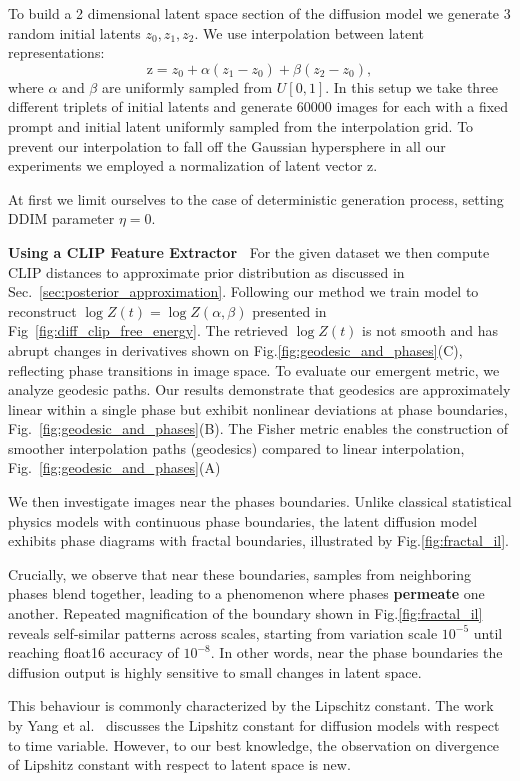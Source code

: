 \documentclass{article}
\theoremstyle{plain}
\theoremstyle{definition}
\theoremstyle{remark}
\begin{document}
To build a 2 dimensional latent space section of the diffusion model we generate 3 random initial latents $z_0, z_1, z_2$. We use interpolation between latent representations:
\[
\text{z} = z_0 + \alpha (z_1 - z_0) + \beta (z_2 - z_0),
\]
where $\alpha$ and $\beta$ are uniformly sampled from $U[0,1]$. 
In this setup we take three different triplets of initial latents and generate 60000 images for each with a fixed prompt and initial latent uniformly sampled from the interpolation grid. To prevent our interpolation to fall off the Gaussian hypersphere in all our experiments we employed a normalization of latent vector z.

At first we limit ourselves to the case of deterministic generation process, setting DDIM parameter $\eta=0$. 

\textbf{Using a CLIP Feature Extractor~} For the given dataset we then compute CLIP distances to approximate prior distribution as discussed in Sec.~\ref{sec:posterior_approximation}. Following our method we train model to reconstruct $\log Z(t) = \log Z(\alpha,\beta)$ presented in Fig~\ref{fig:diff_clip_free_energy}.
The retrieved $\log Z(t)$ is not smooth and has abrupt changes in derivatives shown on Fig.\ref{fig:geodesic_and_phases}(C), reflecting phase transitions in image space. 
To evaluate our emergent metric, we analyze geodesic paths. Our results demonstrate that geodesics are approximately linear within a single phase but exhibit nonlinear deviations at phase boundaries, Fig.~\ref{fig:geodesic_and_phases}(B).
The Fisher metric enables the construction of smoother interpolation paths (geodesics) compared to linear interpolation, Fig.~\ref{fig:geodesic_and_phases}(A)

We then investigate images near the phases boundaries.
Unlike classical statistical physics models with continuous phase boundaries, the latent diffusion model exhibits phase diagrams with fractal boundaries, illustrated by Fig.\ref{fig:fractal_il}.

Crucially, we observe that near these boundaries, samples from neighboring phases blend together, leading to a phenomenon where phases \textbf{permeate} one another. Repeated magnification of the boundary shown in Fig.\ref{fig:fractal_il} reveals self-similar patterns across scales, starting from variation scale $10^{-5}$ until reaching float16 accuracy of $10^{-8}$. In other words, near the phase boundaries the diffusion output is highly sensitive to small changes in latent space.

This behaviour is commonly characterized by the Lipschitz constant. The  work by Yang et al.~\cite{yang2023lipschitz} discusses the Lipshitz constant for diffusion models with respect to time variable. However, to our best knowledge, the observation on divergence of Lipshitz constant with respect to latent space is new.
\end{document}
